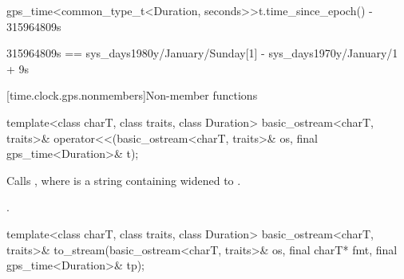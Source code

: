 \begin{itemdescr}
\pnum
\returns
\begin{codeblock}
gps_time<common_type_t<Duration, seconds>>{t.time_since_epoch()} - 315964809s
\end{codeblock}
\begin{note}
\begin{codeblock}
315964809s == sys_days{1980y/January/Sunday[1]} - sys_days{1970y/January/1} + 9s
\end{codeblock}
\end{note}
\end{itemdescr}

[time.clock.gps.nonmembers]{Non-member functions}

%
\begin{itemdecl}
template<class charT, class traits, class Duration>
  basic_ostream<charT, traits>&
    operator<<(basic_ostream<charT, traits>& os, final gps_time<Duration>& t);
\end{itemdecl}

\begin{itemdescr}
\pnum
\effects Calls ,
where  is a string containing
 widened to .

\pnum
\returns {}.
\end{itemdescr}

%
\begin{itemdecl}
template<class charT, class traits, class Duration>
  basic_ostream<charT, traits>&
    to_stream(basic_ostream<charT, traits>& os, final charT* fmt, final gps_time<Duration>& tp);
\end{itemdecl}

